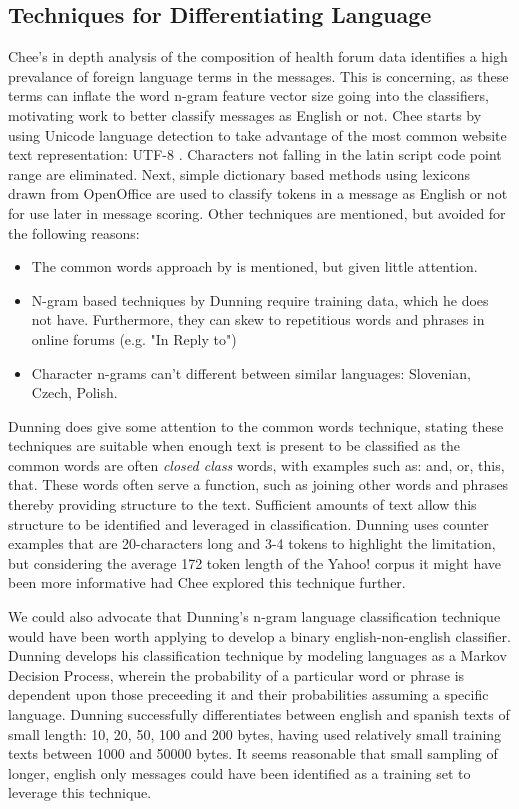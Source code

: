 \documentclass[twoside,11pt]{article}
\begin{document}
\subsection{Techniques for Differentiating Language}
Chee's in depth analysis of the composition of health forum data identifies a high prevalance of foreign language terms in the messages. This is concerning, as these terms can inflate the word n-gram feature vector size going into the classifiers, motivating work to better classify messages as English or not. Chee starts by using Unicode language detection to take advantage of the most common website text representation: UTF-8 \citep{UTF_8 article on Wikipedia}. Characters not falling in the latin script code point range are eliminated.
Next, simple dictionary based methods using lexicons drawn from OpenOffice are used to classify tokens in a message as English or not for use later in message scoring. Other techniques are mentioned, but avoided for the following reasons:
\begin{itemize}
  \item The common words approach by \citep{Ingle, 1976} is mentioned, but given little attention.
  \item N-gram based techniques by Dunning \citep{Dunning} require training data, which he does not have. Furthermore, they can skew to repetitious words and phrases in online forums (e.g. "In Reply to")
  \item Character n-grams can't different between similar languages: Slovenian, Czech, Polish.
\end{itemize}

Dunning \citep{Dunning} does give some attention to the common words technique, stating these techniques are suitable when enough text is present to be classified as the common words are often \textit{closed class} words, with examples such as: and, or, this, that. These words often serve a function, such as joining other words and phrases thereby providing structure to the text. Sufficient amounts of text allow this structure to be identified and leveraged in classification. Dunning uses counter examples that are 20-characters long and 3-4 tokens to highlight the limitation, but considering the average 172 token length of the Yahoo! corpus it might have been more informative had Chee explored this technique further.

We could also advocate that Dunning's n-gram language classification technique would have been worth applying to develop a binary english-non-english classifier. Dunning develops his classification technique by modeling languages as a Markov Decision Process, wherein the probability of a particular word or phrase is dependent upon those preceeding it and their probabilities assuming a specific language. Dunning successfully differentiates between english and spanish texts of small length: 10, 20, 50, 100 and 200 bytes, having used relatively small training texts between 1000 and 50000 bytes. It seems reasonable that small sampling of longer, english only messages could have been identified as a training set to leverage this technique.
\end{document}
